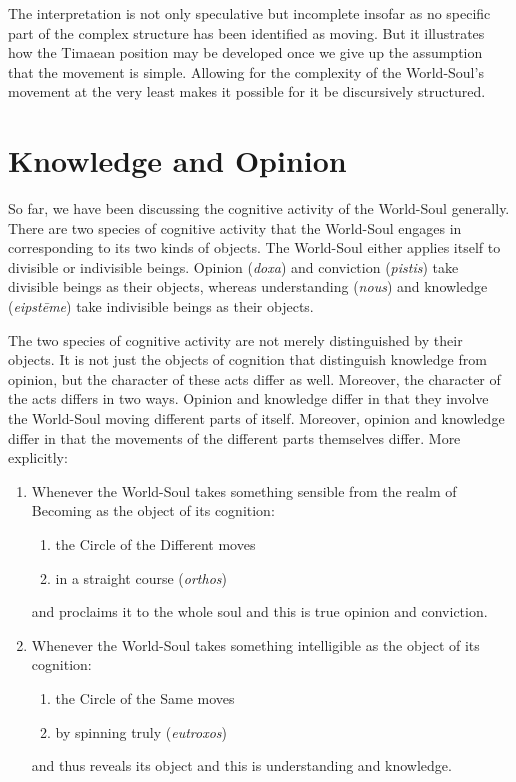 The interpretation is not only speculative but incomplete insofar as no specific part of the complex structure has been identified as moving. But it illustrates how the Timaean position may be developed once we give up the assumption that the movement is simple. Allowing for the complexity of the World-Soul's movement at the very least makes it possible for it be discursively structured.


\section{Knowledge and Opinion} %
\label{sec:knowledge_and_opinion}

So far, we have been discussing the cognitive activity of the World-Soul generally. There are two species of cognitive activity that the World-Soul engages in corresponding to its two kinds of objects. The World-Soul either applies itself to divisible or indivisible beings. Opinion (\emph{doxa}) and conviction (\emph{pistis}) take divisible beings as their objects, whereas understanding (\emph{nous}) and knowledge (\emph{eipstēme}) take indivisible beings as their objects. 

The two species of cognitive activity are not merely distinguished by their objects. It is not just the objects of cognition that distinguish knowledge from opinion, but the character of these acts differ as well. Moreover, the character of the acts differs in two ways. Opinion and knowledge differ in that they involve the World-Soul moving different parts of itself. Moreover, opinion and knowledge differ in that the movements of the different parts themselves differ. More explicitly:
\begin{enumerate}[(1)]
	\item Whenever the World-Soul takes something sensible from the realm of Becoming as the object of its cognition:
	\begin{enumerate}
		\item the Circle of the Different moves
		\item in a straight course (\emph{orthos})
	\end{enumerate}
and proclaims it to the whole soul and this is true opinion and conviction.
	\item Whenever the World-Soul takes something intelligible as the object of its cognition:
	\begin{enumerate}
		\item the Circle of the Same moves
		\item by spinning truly (\emph{eutroxos})
	\end{enumerate}
and thus reveals its object and this is understanding and knowledge.
\end{enumerate}

